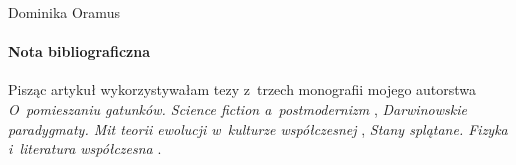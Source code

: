 \begin{artplenv}{Dominika Oramus}
\paragraph{Nota bibliograficzna}
Pisząc artykuł wykorzystywałam tezy z~trzech monografii mojego autorstwa \textit{O~pomieszaniu gatunków. Science fiction a~postmodernizm}
\parencite*[][]{oramus_o_2010}, %
 \textit{Darwinowskie} \textit{paradygmaty. Mit teorii ewolucji w~kulturze współczesnej} 
\parencite*[][]{oramus_darwinowskie_2015}, %
 \textit{Stany splątane. Fizyka i~literatura współczesna} 
\parencite*[][]{oramus_stany_2020}.%



\end{artplenv}